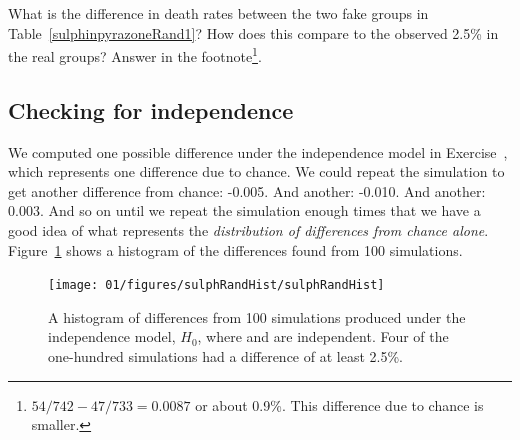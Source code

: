 
\begin{exercise} \label{sampleDifferenceInDrugAndPlaceboGroupSulph}
What is the difference in death rates between the two fake groups in Table~\ref{sulphinpyrazoneRand1}? How does this compare to the observed 2.5\% in the real groups? Answer in the footnote\footnote{$54/742 - 47/733=0.0087$ or about 0.9\%. This difference due to chance is smaller.}. %
\end{exercise}

\subsection{Checking for independence}

We computed one possible difference under the independence model in Exercise~, which represents one difference due to chance. We could repeat the simulation to get another difference from chance: -0.005. And another: -0.010. And another: 0.003. And so on until we repeat the simulation enough times that we have a good idea of what represents the \emph{distribution of differences from chance alone}. Figure~\ref{sulphRandHist} shows a histogram of the differences found from 100 simulations.
\setlength{\captionwidth}{\mycaptionwidth+3mm}
 \begin{figure}[ht]
    \centering
    \texttt{[image: 01/figures/sulphRandHist/sulphRandHist]}
    \caption{A histogram of differences from 100 simulations produced under the independence model, $H_0$, where  and  are independent. Four of the one-hundred simulations had a difference of at least 2.5\%.}
    \label{sulphRandHist}
 \end{figure}
\setlength{\captionwidth}{\mycaptionwidth}
 
